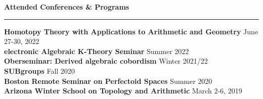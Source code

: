 \documentclass[11pt]{article}
\newenvironment{mysection}{
\color{mygreen}\bfseries\large
}
{
\\ \rule{\textwidth}{1pt}\hspace{-.25em}
} %
\begin{document}
\begin{mysection}Attended Conferences \& Programs\end{mysection}
\textbf{Homotopy Theory with Applications to Arithmetic and Geometry} \hfill June 27-30, 2022 \\
\textbf{electronic Algebraic K-Theory Seminar} \hfill Summer 2022 \\
\textbf{Oberseminar: Derived algebraic cobordism} \hfill Winter 2021/22 \\
\textbf{SUBgroups} \hfill Fall 2020 \\
\textbf{Boston Remote Seminar on Perfectoid Spaces} \hfill Summer 2020 \\
\textbf{Arizona Winter School on Topology and Arithmetic} \hfill March 2-6, 2019 \\
\end{document}
